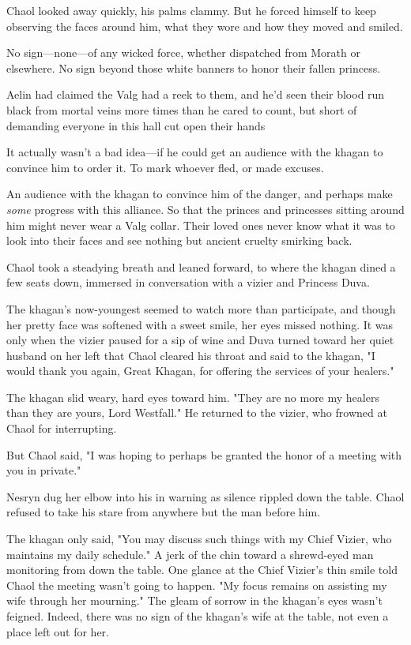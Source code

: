 Chaol looked away quickly, his palms clammy.
But he forced himself to keep observing the faces around him, what they wore and how they moved and smiled.

No sign---none---of any wicked force, whether dispatched from Morath or elsewhere.
No sign beyond those white banners to honor their fallen princess.

Aelin had claimed the Valg had a reek to them, and he'd seen their blood run black from mortal veins more times than he cared to count, but short of demanding everyone in this hall cut open their hands 

It actually wasn't a bad idea---if he could get an audience with the khagan to convince him to order it.
To mark whoever fled, or made excuses.

An audience with the khagan to convince him of the danger, and perhaps make \emph{some} progress with this alliance.
So that the princes and princesses sitting around him might never wear a Valg collar.
Their loved ones never know what it was to look into their faces and see nothing but ancient cruelty smirking back.

Chaol took a steadying breath and leaned forward, to where the khagan dined a few seats down, immersed in conversation with a vizier and Princess Duva.

The khagan's now-youngest seemed to watch more than participate, and though her pretty face was softened with a sweet smile, her eyes missed nothing.
It was only when the vizier paused for a sip of wine and Duva turned toward her quiet husband on her left that Chaol cleared his throat and said to the khagan, "I would thank you again, Great Khagan, for offering the services of your healers."

The khagan slid weary, hard eyes toward him.
"They are no more my healers than they are yours, Lord Westfall."
He returned to the vizier, who frowned at Chaol for interrupting.

But Chaol said, "I was hoping to perhaps be granted the honor of a meeting with you in private."

Nesryn dug her elbow into his in warning as silence rippled down the table.
Chaol refused to take his stare from anywhere but the man before him.

The khagan only said, "You may discuss such things with my Chief Vizier, who maintains my daily schedule."
A jerk of the chin toward a shrewd-eyed man monitoring from down the table.
One glance at the Chief Vizier's thin smile told Chaol the meeting wasn't going to happen.
"My focus remains on assisting my wife through her mourning."
The gleam of sorrow in the khagan's eyes wasn't feigned.
Indeed, there was no sign of the khagan's wife at the table, not even a place left out for her.

